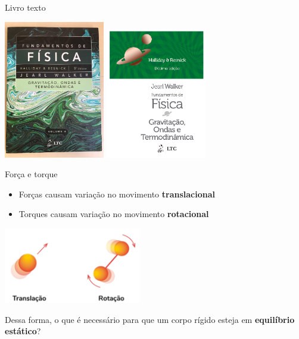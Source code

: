 \begin{frame}[c]{Livro texto}
    \begin{center}
        \includegraphics[width=0.33\textwidth]{images/halliday_9.png}
        \includegraphics[width=0.33\textwidth]{images/halliday_10.png}
    \end{center}
\end{frame}

\begin{frame}{Força e torque}
    \begin{itemize}
        \item Forças causam variação no movimento \textbf{translacional}
        \item Torques causam variação no movimento \textbf{rotacional}
    \end{itemize}
    \begin{center}
        \includegraphics[width=6cm]{images/translação-rotação.png}
    \end{center}
    \pause
    Dessa forma, o que é necessário para que um corpo rígido esteja em \textbf{equilíbrio estático}?
\end{frame}


